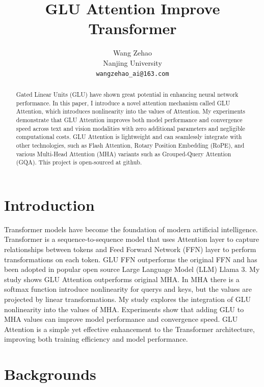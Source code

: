 \documentclass[11pt]{article}
\title{GLU Attention Improve Transformer}
\author{
Wang Zehao \\
Nanjing University \\
\texttt{wangzehao\_ai@163.com}
}
\begin{document}
\maketitle

\begin{abstract}

Gated Linear Units (GLU) have shown great potential in enhancing neural network performance. In this paper, I introduce a novel attention mechanism called GLU Attention, which introduces nonlinearity into the values of Attention. My experiments demonstrate that GLU Attention improves both model performance and convergence speed across text and vision modalities with zero additional parameters and negligible computational costs. GLU Attention is lightweight and can seamlessly integrate with other technologies, such as Flash Attention, Rotary Position Embedding (RoPE), and various Multi-Head Attention (MHA) variants such as Grouped-Query Attention (GQA). This project is open-sourced at github\cite{wangzehao2025gluattentiongithub}.
\end{abstract}


\section{Introduction}

Transformer\cite{vaswani2023attentionneed} models have become the foundation of modern artificial intelligence. Transformer is a sequence-to-sequence model that uses Attention layer to capture relationships between tokens and Feed Forward Network (FFN) layer to perform transformations on each token. GLU FFN\cite{shazeer2020gluvariantsimprovetransformer} outperforms the original FFN and has been adopted in popular open source Large Language Model (LLM) Llama 3\cite{grattafiori2024llama3herdmodels}. My study shows GLU Attention outperforms original MHA. In MHA there is a softmax function introduce nonlinearity for querys and keys, but the values are projected by linear transformations. My study explores the integration of GLU nonlinearity into the values of MHA. Experiments show that adding GLU to MHA values can improve model performance and convergence speed. GLU Attention is a simple yet effective enhancement to the Transformer architecture, improving both training efficiency and model performance.

\section{Backgrounds}
\end{document}
